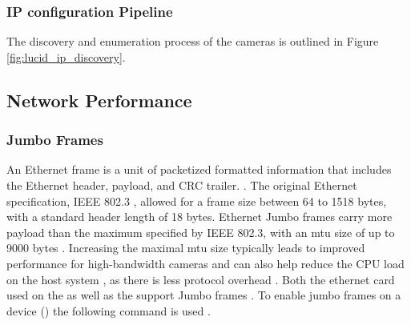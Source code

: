 \subsubsection{IP configuration Pipeline}


The discovery and enumeration process of the \lucid cameras is outlined in Figure \ref{fig:lucid_ip_discovery}.
\subsection{Network Performance}

\subsubsection{Jumbo Frames}
An Ethernet frame is a unit of packetized formatted information that includes the Ethernet header, payload, and CRC trailer. \cite{winterCisco3ComApplied2009}.
The original Ethernet specification, IEEE 802.3 \cite{ieeeIEEEStandardsInterpretation2002}, allowed for a frame size between 64 to 1518 bytes, with a standard header length of 18 bytes.
Ethernet Jumbo frames carry more payload than the maximum specified by IEEE 802.3, with an \gls{mtu} size of up to 9000 bytes \cite{lucidvisionlabsJumboFramesLUCID2020}.
Increasing the maximal \gls{mtu} size typically leads to improved performance for high-bandwidth cameras and can also help reduce the CPU load on the host system \cite{lucidvisionlabsJumboFramesLUCID2020}, as there is less protocol overhead \cite{lukeThingsYouShould2018}.
Both the ethernet card used on the \jx as well as the \cams support Jumbo frames \cite{IntelI350am4Chipa} \cite{TritonMPPolarized2020a}. To enable jumbo frames on a device () the following command is used .

